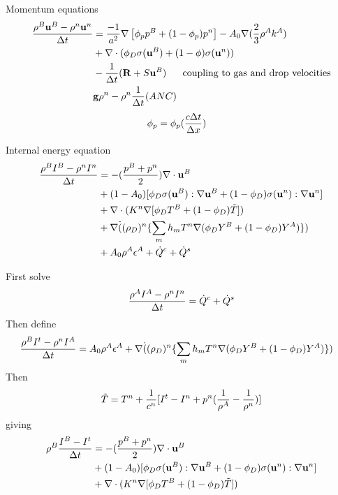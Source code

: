 \documentclass{article}
\begin{document}
Momentum equations
\begin{align*}
  {\rho^B {\bf u}^B - \rho^n{\bf u}^n \over {\Delta t}} &= {-1\over a^2} \nabla\left[ \phi_p p^B + (1-\phi_p)p^n\right]
       -A_0 \nabla( {2\over 3} \rho^A k^A ) \\
     & + \nabla\cdot( \phi_D {\bf\sigma}({\bf u}^B) + (1-\phi){\bf\sigma}({\bf u}^n) ) \\
     & - {1\over {\Delta t}} ( {\bf R} + S {\bf u}^B ) ~~~~~\mbox{coupling to gas and drop velocities}\\
     & {\bf g} \rho^n - \rho^n {1 \over {\Delta t}} (ANC)
\end{align*}
\begin{align*}
   \phi_p & = \phi_p( {c{\Delta t}\over{\Delta x}} )
\end{align*}

Internal energy equation
\begin{align*}
  {\rho^B I^B - \rho^n I^n \over {\Delta t}} &= - ({p^B+p^n \over 2})\nabla\cdot{\bf u}^B  \\
          & + (1-A_0)[ \phi_D {\bf\sigma}({\bf u}^B):\nabla{\bf u}^B + (1-\phi_D) {\bf\sigma}({\bf u}^n):\nabla{\bf u}^n] \\
          & +\nabla\cdot( K^n \nabla[ \phi_D T^B + (1-\phi_D) \tilde{T} ] ) \\
          & +\nabla\dot( (\rho_D)^n \{ \sum_m h_m T^n \nabla( \phi_D Y^B + (1-\phi_D)Y^A ) \} ) \\
          & + A_0 \rho^A \epsilon^A + \dot{Q}^c + \dot{Q}^s 
\end{align*}

First solve
\[
   {\rho^A I^A - \rho^n I^n \over {\Delta t} } = \dot{Q}^c + \dot{Q}^s 
\]
Then define
\begin{align*}
  {\rho^B I^t - \rho^n I^A \over {\Delta t}} &= 
               A_0 \rho^A \epsilon^A  +\nabla\dot( (\rho_D)^n \{ \sum_m h_m T^n \nabla( \phi_D Y^B + (1-\phi_D)Y^A ) \} )
\end{align*}
Then 
\[
  \tilde{T} = T^n + {1\over c^n}[ I^t - I^n + p^n( {1\over \rho^A} - {1\over \rho^n} ) ]
\]
giving
\begin{align*}
\rho^B { I^B - I^t \over {\Delta t}} &= - ({p^B+p^n \over 2})\nabla\cdot{\bf u}^B \\
          & + (1-A_0)[ \phi_D {\bf\sigma}({\bf u}^B):\nabla{\bf u}^B + (1-\phi_D) {\bf\sigma}({\bf u}^n):\nabla{\bf u}^n] \\
  & +\nabla\cdot( K^n \nabla[ \phi_D T^B + (1-\phi_D) \tilde{T} ] )
\end{align*}
\end{document}
